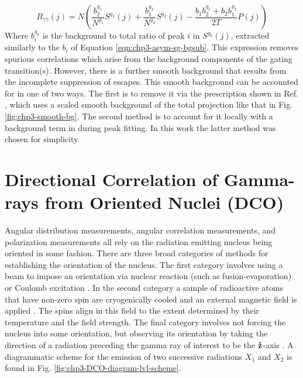\begin{equation}
\label{eqn:chp3-asym-bg-dg-exp}
B_{\gamma{}\gamma{}}(j)=N\left(\frac{b^{g_1}_2}{N^{g_1}}S^{g_1}(j) + \frac{b^{g_2}_1}{N^{g_2}}S^{g_2}(j) - \frac{b_1b^{g_1}_2+b_2b^{g_2}_1}{2T}P(j) \right)
\end{equation}
Where $b^{g_k}_i$ is the background to total ratio of peak $i$ in $S^{g_k}(j)$, extracted similarly to the $b_i$ of Equation \ref{eqn:chp3-asym-sg-bgsub}. This expression removes spurious correlations which arise from the background components of the gating transition(s). However, there is a further smooth background that results from the incomplete suppression of escapes. This smooth background can be accounted for in one of two ways. The first is to remove it via the prescription shown in Ref. \cite{asymBGSub}, which uses a scaled smooth background of the total projection like that in Fig. \ref{fig:chp3-smooth-bg}. The second method is to account for it locally with a background term in during peak fitting. In this work the latter method was chosen for simplicity.

\section{Directional Correlation of Gamma-rays from Oriented Nuclei (DCO)}
\label{sec:exp-pr-data-ang}
Angular distribution measurements, angular correlation measurements, and polarization measurements all rely on the radiation emitting nucleus being oriented in some fashion. There are three broad categories of methods for establishing the orientation of the nucleus. The first category involves using a beam to impose an orientation via nuclear reaction (such as fusion-evaporation) or Coulomb excitation \cite{emInteraction,dcoKrane}. In the second category a sample of radioactive atoms that have non-zero spin are cryogenically cooled and an external magnetic field is applied \cite{cryoOrientationKrane}. The spins align in this field to the extent determined by their temperature and the field strength. The final category involves not forcing the nucleus into some orientation, but observing its orientation by taking the direction of a radiation preceding the gamma ray of interest to be the $\boldsymbol{\hat{\textbf{z}}}$-axis \cite{emInteraction,dcoKrane}. A diagrammatic scheme for the emission of two successive radiations $X_1$ and $X_2$ is found in Fig. \ref{fig:chp3-DCO-diagram-lvl-scheme}.

